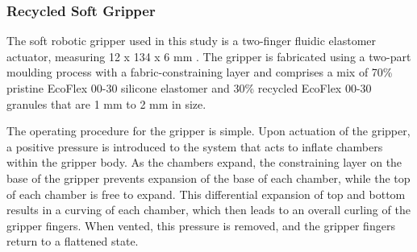 \documentclass[lettersize,journal]{IEEEtran}
\begin{document}
\subsubsection{Recycled Soft Gripper}
The soft robotic gripper used in this study is a two-finger fluidic elastomer actuator, measuring 12 x 134 x 6 mm \cite{Partridge2022}. The gripper is fabricated using a two-part moulding process with a fabric-constraining layer and comprises a mix of 70\% pristine EcoFlex 00-30 silicone elastomer and 30\% recycled EcoFlex 00-30 granules that are 1 mm to 2 mm in size.%

The operating procedure for the gripper is simple. Upon actuation of the gripper, a positive pressure is introduced to the system that acts to inflate chambers within the gripper body. As the chambers expand, the constraining layer on the base of the gripper prevents expansion of the base of each chamber, while the top of each chamber is free to expand. This differential expansion of top and bottom results in a curving of each chamber, which then leads to an overall curling of the gripper fingers. When vented, this pressure is removed, and the gripper fingers return to a flattened state. 

%
\end{document}
